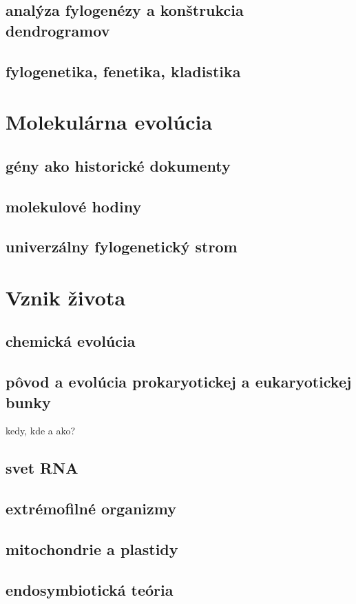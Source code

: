 \subsection*{analýza fylogenézy a konštrukcia dendrogramov}
\subsection*{fylogenetika, fenetika, kladistika}

\section{Molekulárna evolúcia}
\subsection*{gény ako historické dokumenty}
\subsection*{molekulové hodiny}
\subsection*{univerzálny fylogenetický strom}

\section{Vznik života}
\subsection*{chemická evolúcia}
\subsection*{pôvod a evolúcia prokaryotickej a eukaryotickej bunky}
kedy, kde a ako?\\
\subsection*{svet RNA}
\subsection*{extrémofilné organizmy}
\subsection*{mitochondrie a plastidy}
\subsection*{endosymbiotická teória}

